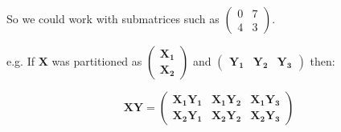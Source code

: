 So we could work with submatrices such as $\left(\begin{array}{rr} 0 & 7 \\ 4 & 3 \end{array} \right)$.

e.g. If $\boldsymbol{X}$ was partitioned as $\left( \begin{array}{r} \boldsymbol{X_{1}} \\ \boldsymbol{X_{2}} \end{array} \right)$ and $\left( \begin{array}{rrr} \boldsymbol{Y_{1}} & \boldsymbol{Y_{2}} & \boldsymbol{Y_{3}} \end{array} \right)$ then:

\begin{displaymath}
\boldsymbol{XY} = \left( \begin{array}{rrr} \boldsymbol{X_{1}Y_{1}} & \boldsymbol{X_{1}Y_{2}} & \boldsymbol{X_{1}Y_{3}} \\
 \boldsymbol{X_{2}Y_{1}} & \boldsymbol{X_{2}Y_{2}} & \boldsymbol{X_{2}Y_{3}}
\end{array} \right)
\end{displaymath}







